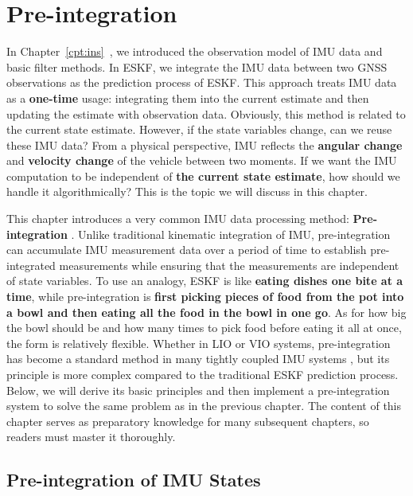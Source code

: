 \chapter{Pre-integration}
\label{cpt:preinteg}
\thispagestyle{empty}
In Chapter~\ref{cpt:ins}~, we introduced the observation model of IMU data and basic filter methods. In ESKF, we integrate the IMU data between two GNSS observations as the prediction process of ESKF. This approach treats IMU data as a \textbf{one-time} usage: integrating them into the current estimate and then updating the estimate with observation data. Obviously, this method is related to the current state estimate. However, if the state variables change, can we reuse these IMU data? From a physical perspective, IMU reflects the \textbf{angular change} and \textbf{velocity change} of the vehicle between two moments. If we want the IMU computation to be independent of \textbf{the current state estimate}, how should we handle it algorithmically? This is the topic we will discuss in this chapter.

This chapter introduces a very common IMU data processing method: \textbf{Pre-integration} \cite{Forster2015}. Unlike traditional kinematic integration of IMU, pre-integration can accumulate IMU measurement data over a period of time to establish pre-integrated measurements while ensuring that the measurements are independent of state variables. To use an analogy, ESKF is like \textbf{eating dishes one bite at a time}, while pre-integration is \textbf{first picking pieces of food from the pot into a bowl and then eating all the food in the bowl in one go}. As for how big the bowl should be and how many times to pick food before eating it all at once, the form is relatively flexible. Whether in LIO or VIO systems, pre-integration has become a standard method in many tightly coupled IMU systems \cite{Chang2020,Yuan2019,Eckenhoff2019}, but its principle is more complex compared to the traditional ESKF prediction process. Below, we will derive its basic principles and then implement a pre-integration system to solve the same problem as in the previous chapter. The content of this chapter serves as preparatory knowledge for many subsequent chapters, so readers must master it thoroughly.



\section{Pre-integration of IMU States}
